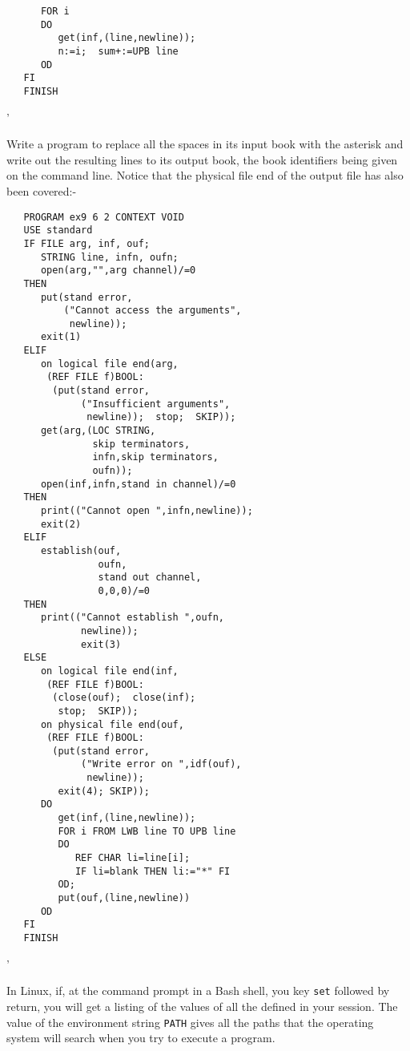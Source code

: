 \begin{exercise}
\begin{verbatim}
      FOR i
      DO
         get(inf,(line,newline));
         n:=i;  sum+:=UPB line
      OD
   FI 
   FINISH
\end{verbatim}
'
\item Write a program to replace all the spaces in its input book
with the asterisk and write out the resulting lines to its output
book, the book identifiers being given on the command line.
\ans Notice that the physical file end of the output file has also
been covered:-
\begin{verbatim}
   PROGRAM ex9 6 2 CONTEXT VOID
   USE standard
   IF FILE arg, inf, ouf;
      STRING line, infn, oufn;
      open(arg,"",arg channel)/=0
   THEN
      put(stand error,
          ("Cannot access the arguments",
           newline));
      exit(1)
   ELIF
      on logical file end(arg,
       (REF FILE f)BOOL:
        (put(stand error,
             ("Insufficient arguments",
              newline));  stop;  SKIP));
      get(arg,(LOC STRING,
               skip terminators,
               infn,skip terminators,
               oufn));
      open(inf,infn,stand in channel)/=0
   THEN
      print(("Cannot open ",infn,newline));
      exit(2)
   ELIF
      establish(ouf,
                oufn,
                stand out channel,
                0,0,0)/=0
   THEN
      print(("Cannot establish ",oufn,
             newline));
             exit(3)
   ELSE
      on logical file end(inf,
       (REF FILE f)BOOL:
        (close(ouf);  close(inf);
         stop;  SKIP));
      on physical file end(ouf,
       (REF FILE f)BOOL:
        (put(stand error,
             ("Write error on ",idf(ouf),
              newline));
         exit(4); SKIP));
      DO
         get(inf,(line,newline));
         FOR i FROM LWB line TO UPB line
         DO
            REF CHAR li=line[i];
            IF li=blank THEN li:="*" FI
         OD;
         put(ouf,(line,newline))
      OD
   FI 
   FINISH
\end{verbatim}
'
\end{exercise}

In Linux, if, at the command prompt in a Bash shell, you key
\verb|set| followed by return, you will get a listing of the values
of all the  defined in
your session. The value of the environment string \verb|PATH| gives
all the paths that the operating system will search when you try to
execute a program.

